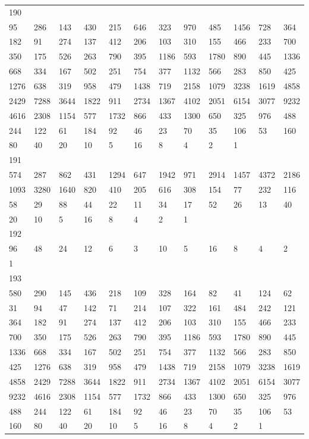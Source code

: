 \begin{longtable}{llllllllllll}
190&&&&&&&&&&&\\
95& 286& 143& 430& 215& 646& 323& 970& 485& 1456& 728& 364\\
182& 91& 274& 137& 412& 206& 103& 310& 155& 466& 233& 700\\
350& 175& 526& 263& 790& 395& 1186& 593& 1780& 890& 445& 1336\\
668& 334& 167& 502& 251& 754& 377& 1132& 566& 283& 850& 425\\
1276& 638& 319& 958& 479& 1438& 719& 2158& 1079& 3238& 1619& 4858\\
2429& 7288& 3644& 1822& 911& 2734& 1367& 4102& 2051& 6154& 3077& 9232\\
4616& 2308& 1154& 577& 1732& 866& 433& 1300& 650& 325& 976& 488\\
244& 122& 61& 184& 92& 46& 23& 70& 35& 106& 53& 160\\
80& 40& 20& 10& 5& 16& 8& 4& 2& 1& \\

191&&&&&&&&&&&\\
574& 287& 862& 431& 1294& 647& 1942& 971& 2914& 1457& 4372& 2186\\
1093& 3280& 1640& 820& 410& 205& 616& 308& 154& 77& 232& 116\\
58& 29& 88& 44& 22& 11& 34& 17& 52& 26& 13& 40\\
20& 10& 5& 16& 8& 4& 2& 1& \\

192&&&&&&&&&&&\\
96& 48& 24& 12& 6& 3& 10& 5& 16& 8& 4& 2\\
1& \\

193&&&&&&&&&&&\\
580& 290& 145& 436& 218& 109& 328& 164& 82& 41& 124& 62\\
31& 94& 47& 142& 71& 214& 107& 322& 161& 484& 242& 121\\
364& 182& 91& 274& 137& 412& 206& 103& 310& 155& 466& 233\\
700& 350& 175& 526& 263& 790& 395& 1186& 593& 1780& 890& 445\\
1336& 668& 334& 167& 502& 251& 754& 377& 1132& 566& 283& 850\\
425& 1276& 638& 319& 958& 479& 1438& 719& 2158& 1079& 3238& 1619\\
4858& 2429& 7288& 3644& 1822& 911& 2734& 1367& 4102& 2051& 6154& 3077\\
9232& 4616& 2308& 1154& 577& 1732& 866& 433& 1300& 650& 325& 976\\
488& 244& 122& 61& 184& 92& 46& 23& 70& 35& 106& 53\\
160& 80& 40& 20& 10& 5& 16& 8& 4& 2& 1& \\


\end{longtable}
